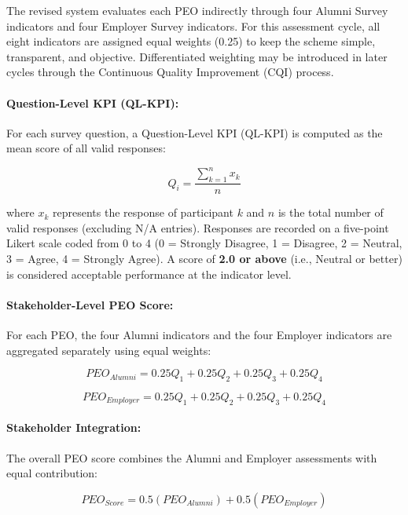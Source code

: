 The revised system evaluates each PEO indirectly through four Alumni Survey indicators and four Employer Survey indicators. For this assessment cycle, all eight indicators are assigned equal weights (0.25) to keep the scheme simple, transparent, and objective. Differentiated weighting may be introduced in later cycles through the Continuous Quality Improvement (CQI) process.

\paragraph{Question-Level KPI (QL-KPI):}
For each survey question, a Question-Level KPI (QL-KPI) is computed as the mean score of all valid responses:

\begin{equation}
Q_i=\frac{\sum_{k=1}^{n} x_k}{n}
\end{equation}

where $x_k$ represents the response of participant $k$ and $n$ is the total number of valid responses (excluding N/A entries). Responses are recorded on a five-point Likert scale coded from 0 to 4 (0 = Strongly Disagree, 1 = Disagree, 2 = Neutral, 3 = Agree, 4 = Strongly Agree). A score of \textbf{2.0 or above} (i.e., Neutral or better) is considered acceptable performance at the indicator level.

\paragraph{Stakeholder-Level PEO Score:}
For each PEO, the four Alumni indicators and the four Employer indicators are aggregated separately using equal weights:

\begin{equation}
PEO_{Alumni}=0.25Q_1+0.25Q_2+0.25Q_3+0.25Q_4
\end{equation}

\begin{equation}
PEO_{Employer}=0.25Q_1+0.25Q_2+0.25Q_3+0.25Q_4
\end{equation}

\paragraph{Stakeholder Integration:}
The overall PEO score combines the Alumni and Employer assessments with equal contribution:

\begin{equation}
PEO_{Score}=0.5(PEO_{Alumni})+0.5(PEO_{Employer})
\end{equation}

